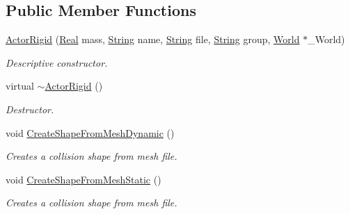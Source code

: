 \subsection*{Public Member Functions}
\begin{DoxyCompactItemize}
\item 
\hyperlink{classphys_1_1ActorRigid_ac42c05745d57eb5745de3f34e820b72d}{ActorRigid} (\hyperlink{namespacephys_af7eb897198d265b8e868f45240230d5f}{Real} mass, \hyperlink{namespacephys_aa03900411993de7fbfec4789bc1d392e}{String} name, \hyperlink{namespacephys_aa03900411993de7fbfec4789bc1d392e}{String} file, \hyperlink{namespacephys_aa03900411993de7fbfec4789bc1d392e}{String} group, \hyperlink{classphys_1_1World}{World} $\ast$\_\-World)
\begin{DoxyCompactList}\small\item\em Descriptive constructor. \item\end{DoxyCompactList}\item 
virtual \hyperlink{classphys_1_1ActorRigid_ab317b5a2578157e54655a1aea8f4d058}{$\sim$ActorRigid} ()
\begin{DoxyCompactList}\small\item\em Destructor. \item\end{DoxyCompactList}\item 
void \hyperlink{classphys_1_1ActorRigid_a067d5beab7602bbc3de852b9b8332113}{CreateShapeFromMeshDynamic} ()
\begin{DoxyCompactList}\small\item\em Creates a collision shape from mesh file. \item\end{DoxyCompactList}\item 
void \hyperlink{classphys_1_1ActorRigid_a84554dcaaf2475ba0ec7dcb9235050ac}{CreateShapeFromMeshStatic} ()
\begin{DoxyCompactList}\small\item\em Creates a collision shape from mesh file. \item\end{DoxyCompactList}\end{DoxyCompactItemize}
